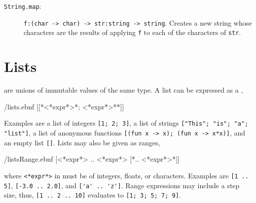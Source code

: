 \begin{description}
 \item[\texttt{String.map}:] \lstinline{f:(char -> char) -> str:string -> string}. Creates a new string whose characters are the results of applying \lstinline{f} to each of the characters of \lstinline{str}.
\end{description}

\section{Lists}
 are unions of immutable values of the same type. A list can be expressed as a ,
%
\begin{verbatimwrite}{\ebnf/lists.ebnf}
[[*<*expr*>{*; <*expr*>*}*]]
\end{verbatimwrite}
%
Examples are a list of integers \mbox{\lstinline![1; 2; 3]!}, a list of strings \mbox{\lstinline!["This"; "is"; "a"; "list"]!}, a list of anonymous functions \mbox{\lstinline![(fun x -> x); (fun x -> x*x)]!}, and an empty list \lstinline![]!. Lists may also be given as ranges,
%
\begin{verbatimwrite}{\ebnf/listsRange.ebnf}
[<*expr*> .. <*expr*> [*.. <*expr*>*]]
\end{verbatimwrite}
%
where \lstinline[language=syntax]{<*expr*>} in  must be of integers, floats, or characters. Examples are \mbox{\lstinline![1 .. 5]!}, \mbox{\lstinline![-3.0 .. 2.0]!}, and \mbox{\lstinline!['a' .. 'z']!}. Range expressions may include a step size, thus, \mbox{\lstinline![1 .. 2 .. 10]!} evaluates to \mbox{\lstinline![1; 3; 5; 7; 9]!}.

